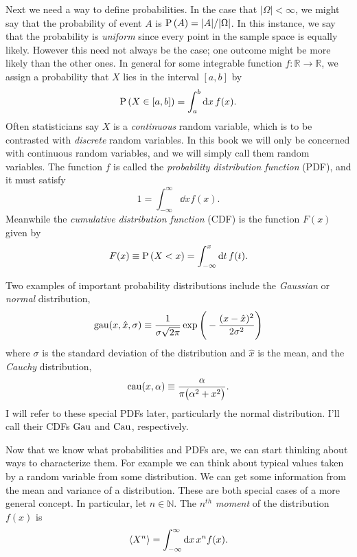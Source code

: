 Next we need a way to define probabilities. In the case that $|\Omega|<\infty$,
we might say that the probability of event $A$ is $\operatorname{P}\left(A\right)=|A|/|\Omega|$. In
this instance, we say that the probability is {\it uniform}
 since every point in the sample space is equally likely. 
However this need not always be the case; one outcome might be more likely 
than the other ones. In general for some integrable function 
$f:\mathbb{R}\to\mathbb{R}$, we assign a 
probability that $X$ lies in the interval $[a,b]$ by
\begin{equation}
  \label{eq:cpr}
  \operatorname{P}\left(X\in[a,b]\right)=\int_a^b\dd{x}f(x).
\end{equation}
Often statisticians say $X$ is a {\it continuous} random variable, which is
to be contrasted with {\it discrete} random variables. In this book we will
only be concerned with continuous random variables, and we will simply call
them random variables.
The function $f$ is called the {\it probability distribution function} (PDF),
 and it must satisfy
\begin{equation}
  1=\int_{-\infty}^\infty\dd{x}f(x).
\end{equation}
Meanwhile the {\it cumulative distribution function} (CDF) is the function
$F(x)$ given by
\begin{equation}
  F(x)\equiv \operatorname{P}\left(X<x\right)=\int_{-\infty}^x\dd{t}f(t).
\end{equation}
\begin{example*}{}{}
Two examples of important probability distributions include the {\it Gaussian}
or {\it normal} distribution,
\begin{equation}
  \operatorname{gau}(x,\hat{x},\sigma)\equiv\frac{1}{\sigma\sqrt{2\pi}}
  \exp\Bigg(-\frac{(x-\hat{x})^2}{2\sigma^2}\Bigg)
\end{equation}
where $\sigma$ is the standard deviation of the distribution and $\hat{x}$ is 
the mean, and the {\it Cauchy}  distribution,
\begin{equation}
  \operatorname{cau}(x,\alpha)\equiv\frac{\alpha}{\pi\big(\alpha^2+x^2\big)}.
\end{equation}
I will refer to these special PDFs later, particularly the normal distribution.
I'll call their CDFs $\operatorname{Gau}$ and $\operatorname{Cau}$, respectively.   
\end{example*}

Now that we know what probabilities and PDFs are, we can start thinking about
ways to characterize them. For example we can think about typical values taken
by a random variable from some distribution. We can get some information
from the mean and variance of a distribution. These are
both special cases of a more general concept.
In particular, let $n\in\mathbb{N}$.
  The {\it $n^{th}$ moment} of the distribution $f(x)$ is
  \begin{equation}\label{dfn:mom}
    \ev{X^n}=\int_{-\infty}^\infty\dd{x}x^nf(x).
  \end{equation}

